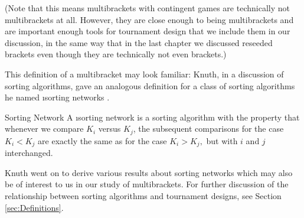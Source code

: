 {    (Note that this means multibrackets with contingent games are technically not multibrackets at all. However, they are close enough to being multibrackets and are important enough tools for tournament design that we include them in our discussion, in the same way that  in the last chapter we discussed reseeded brackets even though they are technically not even brackets.)

    This definition of a multibracket may look familiar: Knuth, in a discussion of sorting algorithms, gave an analogous definition for a class of sorting algorithms he named \i{sorting networks} \cite{knuth}.

    \begin{definition}{Sorting Network}{}
        A \i{sorting network} is a sorting algorithm with the property that whenever we compare $K_i$ versus $K_j$, the subsequent comparisons for the case  $K_i < K_j$ are exactly the same as for the case $K_i > K_j,$ but with $i$ and $j$ interchanged.
    \end{definition}

    Knuth went on to derive various results about sorting networks which may also be of interest to us in our study of multibrackets. For further discussion of the relationship between sorting algorithms and tournament designs, see Section \ref{sec:Definitions}. %
        
}



